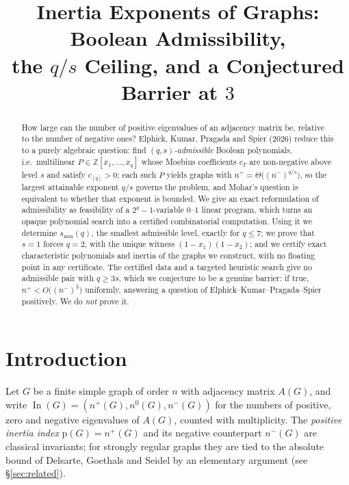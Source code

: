 \documentclass[11pt,a4paper]{article}
\title{\bfseries Inertia Exponents of Graphs: Boolean Admissibility,\\
the \texorpdfstring{$q/s$}{q/s} Ceiling, and a Conjectured Barrier at $3$}
\author{}
\date{}
\theoremstyle{plain}
\theoremstyle{definition}
\newcommand{\ZZ}{\mathbb{Z}}
\newcommand{\pp}{\mathrm{p}}
\newcommand{\Ind}{\operatorname{In}}
\begin{document}
\maketitle

\begin{abstract}
How large can the number of positive eigenvalues of an adjacency matrix be, relative to
the number of negative ones?  Elphick, Kumar, Pragada and Spier (2026) reduce this to a
purely algebraic question: find \emph{$(q,s)$-admissible} Boolean polynomials, i.e.\ 
multilinear $P\in\ZZ[x_1,\dots,x_q]$ whose Moebius coefficients $c_T$ are non-negative
above level $s$ and satisfy $c_{[q]}>0$; each such $P$ yields graphs with
$n^+=\Theta\big((n^-)^{q/s}\big)$, so the largest attainable exponent $q/s$ governs the
problem, and Mohar's question is equivalent to whether that exponent is bounded.  We
give an exact reformulation of admissibility as feasibility of a $2^q-1$-variable
$0$--$1$ linear program, which turns an opaque polynomial search into a certified
combinatorial computation.  Using it we determine $s_{\min}(q)$, the smallest admissible
level, exactly for $q\le 7$; we prove that $s=1$ forces $q=2$, with the unique witness
$(1-x_1)(1-x_2)$; and we certify exact characteristic polynomials and inertia of the
graphs we construct, with no floating point in any certificate.  The certified data and
a targeted heuristic search give no admissible pair with $q\ge 3s$, which we conjecture
to be a genuine barrier: if true, $n^+<O\big((n^-)^3\big)$ uniformly, answering a
question of Elphick--Kumar--Pragada--Spier positively.  We do \emph{not} prove it.
\end{abstract}

\section{Introduction}

Let $G$ be a finite simple graph of order $n$ with adjacency matrix $A(G)$, and write
$\Ind(G)=(n^+(G),n^0(G),n^-(G))$ for the numbers of positive, zero and negative
eigenvalues of $A(G)$, counted with multiplicity.  The \emph{positive inertia index}
$\pp(G)=n^+(G)$ and its negative counterpart $n^-(G)$ are classical invariants; for
strongly regular graphs they are tied to the absolute bound of Delsarte, Goethals and
Seidel by an elementary argument (see \S\ref{sec:related}).
\end{document}
